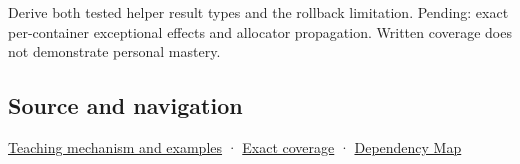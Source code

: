 Derive both tested helper result types and the rollback limitation. Pending: exact per-container exceptional effects and allocator propagation. Written coverage does not demonstrate personal mastery.

\subsection{Source and navigation}\label{appendix-c746afaa47d1-source-and-navigation}

\hyperref[01-foundations-i-ch003-failure-guarantees-shape-the-transfer-algorithm]{Teaching mechanism and examples} · \hyperref[appendix-fd090d982a15-m009---parts-127-147]{Exact coverage} · \hyperref[appendix-4ad47bdd269a]{Dependency Map}
